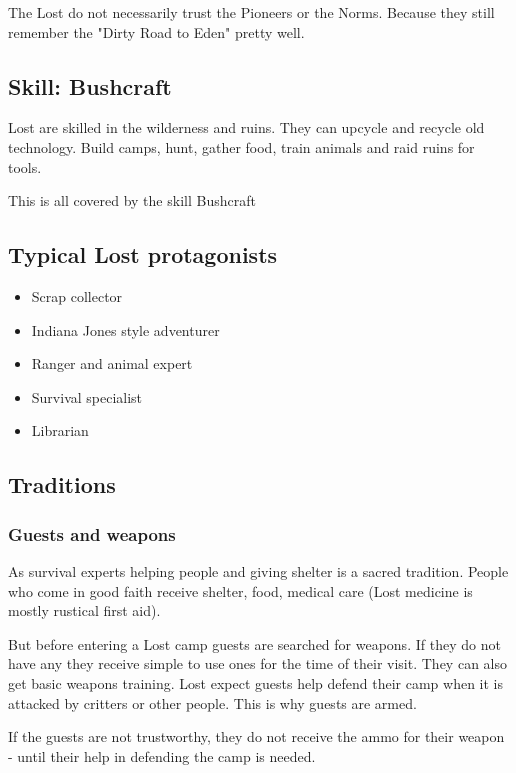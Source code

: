 The Lost do not necessarily trust the Pioneers or the Norms. Because they still remember the "Dirty Road to Eden" pretty well.

\subsection{Skill: Bushcraft}

Lost are skilled in the wilderness and ruins. They can upcycle and recycle old technology. Build camps, hunt, gather food, train animals and raid ruins for tools.

This is all covered by the skill Bushcraft

\subsection{Typical Lost protagonists}

\begin{itemize}
    \item Scrap collector
    \item Indiana Jones style adventurer
    \item Ranger and animal expert
    \item Survival specialist
    \item Librarian
\end{itemize}

\subsection{Traditions}

\subsubsection{Guests and weapons}

As survival experts helping people and giving shelter is a sacred tradition. People who come in good faith receive shelter, food, medical care (Lost medicine is mostly rustical first aid).

But before entering a Lost camp guests are searched for weapons. If they do not have any they receive simple to use ones for the time of their visit. They can also get basic weapons training. Lost expect guests help defend their camp when it is attacked by critters or other people. This is why guests are armed.

If the guests are not trustworthy, they do not receive the ammo for their weapon - until their help in defending the camp is needed.

